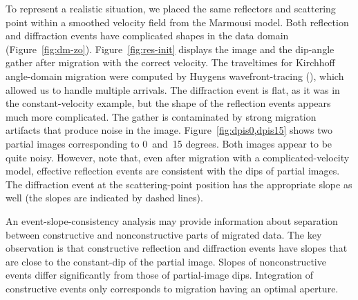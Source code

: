 To represent a realistic situation, we placed the same reflectors and
scattering point within a smoothed velocity field from the Marmousi
model.  Both reflection and diffraction events have complicated shapes
in the data domain (Figure~\ref{fig:dm-zo}). Figure~\ref{fig:res-init}
displays the image and the dip-angle gather after migration with the
correct velocity. The traveltimes for Kirchhoff angle-domain
migration were computed by Huygens wavefront-tracing
(\citealp{sava01}), which allowed us to handle multiple arrivals. The
diffraction event is flat, as it was in the constant-velocity example,
but the shape of the reflection events appears much more
complicated. The gather is contaminated by strong migration artifacts
that produce noise in the image. Figure~\ref{fig:dpis0,dpis15} shows
two partial images corresponding to 0~and~15 degrees.  Both images
appear to be quite noisy. However, note that, even after migration
with a complicated-velocity model, effective reflection events are
consistent with the dips of partial images. The diffraction event at
the scattering-point position has the appropriate slope as
well (the slopes are indicated by dashed lines).

An event-slope-consistency analysis may provide information about separation between constructive
and nonconstructive parts of migrated data. The key observation is that constructive reflection and diffraction events have slopes
that are close to the constant-dip of the partial image. Slopes of nonconstructive events differ significantly from those of partial-image
dips. Integration of constructive events only corresponds to migration having an optimal
aperture.



